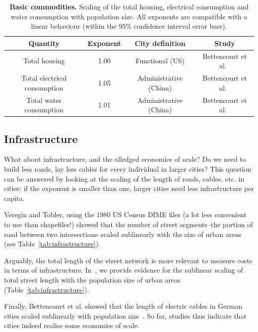 \begin{table}[!h]
    \centering
\begin{tabular}{|cccc|}
\hline
Quantity & Exponent & City definition & Study\\
\hline
Total housing & 1.00 & Functional (US) & Bettencourt et al.~\cite{Bettencourt:2007}\\
Total electrical consumption & 1.05 & Administrative (China) & Bettencourt et al.~\cite{Bettencourt:2007}\\
Total water consumption & 1.01 & Administrative (China) & Bettencourt et al.~\cite{Bettencourt:2007}\\
\hline
\end{tabular}
\caption{{\bf Basic commodities. } Scaling of the total housing, electrical
    consumption and water consumption with population size. All exponents are
    compatible with a linear behaviour (within the $95\%$ confidence interval
    error bars).\label{tab:commodities}
}
\end{table}



\subsection{Infrastructure}
\label{sub:infrastructure}

What about infrastructure, and the alledged economies of scale? Do we need to build less
roads, lay less cables for every individual in larger cities? This question can
be answered by looking at the scaling of the length of roads, cables, etc. in
cities: if the exponent is smaller than one, larger cities need less
infrastructure per capita.

Veregin and Tobler, using the 1980 US Census DIME files (a lot less convenient
to use than shapefiles!) showed that the number of street segments--the portion
of road between two intersections--scaled sublinearly with the size of urban
areas~\cite{Veregin:1997} (see Table~\ref{tab:infrastructure}). 

Arguably, the total length of the street network is more relevant to measure
costs in terms of infrastructure. In~\cite{Louf:2014_scaling}, we provide
evidence for the sublinear scaling of total street length with the population
size of urban areas (Table~\ref{tab:infrastructure}). 

Finally, Bettencourt et al. showed that the length of electric cables in German
cities scaled sublinearly with population size~\cite{Bettencourt:2007}. So far,
studies thus indicate that cities indeed realise some economies of scale.

